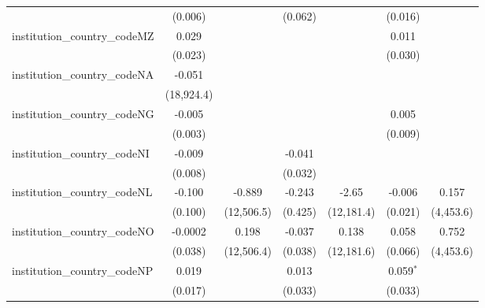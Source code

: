 \begin{tabular}{lcccccc}
                                         & (0.006)        &               & (0.062)       &               & (0.016)       &   \\   
   institution\_country\_codeMZ          & 0.029          &               &               &               & 0.011         &   \\   
                                         & (0.023)        &               &               &               & (0.030)       &   \\   
   institution\_country\_codeNA          & -0.051         &               &               &               &               &   \\   
                                         & (18,924.4)     &               &               &               &               &   \\   
   institution\_country\_codeNG          & -0.005         &               &               &               & 0.005         &   \\   
                                         & (0.003)        &               &               &               & (0.009)       &   \\   
   institution\_country\_codeNI          & -0.009         &               & -0.041        &               &               &   \\   
                                         & (0.008)        &               & (0.032)       &               &               &   \\   
   institution\_country\_codeNL          & -0.100         & -0.889        & -0.243        & -2.65         & -0.006        & 0.157\\   
                                         & (0.100)        & (12,506.5)    & (0.425)       & (12,181.4)    & (0.021)       & (4,453.6)\\   
   institution\_country\_codeNO          & -0.0002        & 0.198         & -0.037        & 0.138         & 0.058         & 0.752\\   
                                         & (0.038)        & (12,506.4)    & (0.038)       & (12,181.6)    & (0.066)       & (4,453.6)\\   
   institution\_country\_codeNP          & 0.019          &               & 0.013         &               & 0.059$^{*}$   &   \\   
                                         & (0.017)        &               & (0.033)       &               & (0.033)       &   \\   

\end{tabular}
